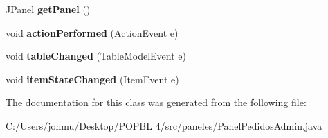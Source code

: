\begin{DoxyCompactItemize}
J\+Panel {\bfseries get\+Panel} ()
\item 
\mbox{\label{classpaneles_1_1_panel_pedidos_admin_aa7bdfe0ead2f6ae46989dc2f4413790e}} 
void {\bfseries action\+Performed} (Action\+Event e)
\item 
\mbox{\label{classpaneles_1_1_panel_pedidos_admin_a484c4ce5aa6fa7f33fb62eb4b9521940}} 
void {\bfseries table\+Changed} (Table\+Model\+Event e)
\item 
\mbox{\label{classpaneles_1_1_panel_pedidos_admin_a977e74f76b8513055d320e5b976e2143}} 
void {\bfseries item\+State\+Changed} (Item\+Event e)
\end{DoxyCompactItemize}


The documentation for this class was generated from the following file\+:\begin{DoxyCompactItemize}
\item 
C\+:/\+Users/jonmu/\+Desktop/\+P\+O\+P\+B\+L 4/src/paneles/Panel\+Pedidos\+Admin.\+java\end{DoxyCompactItemize}
